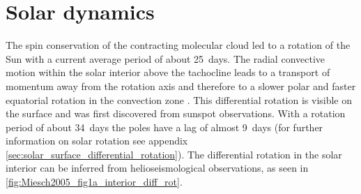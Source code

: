 \section{Solar dynamics}
\label{sec:solar_dynamics}
The spin conservation of the contracting molecular cloud led to a rotation of the Sun with a current average period of about 25~days. The radial convective motion within the solar interior above the tachocline leads to a transport of momentum away from the rotation axis and therefore to a slower polar and faster equatorial rotation in the convection zone \citep{Miesch2005}. This differential rotation is visible on the surface and was first discovered from sunspot observations. %
With a rotation period of about 34~days the poles have a lag of almost 9~days (for further information on solar rotation see appendix \autoref{sec:solar_surface_differential_rotation}). The differential rotation in the solar interior can be inferred from helioseismological observations, as seen in \autoref{fig:Miesch2005_fig1a_interior_diff_rot}.\\
